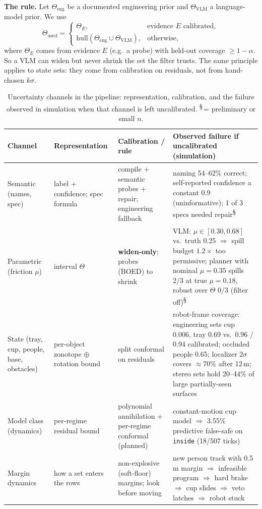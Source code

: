 \documentclass[10pt,twocolumn,letterpaper]{article}
\newcommand{\pre}{\textsuperscript{\S}}   %
\begin{document}
\textbf{The rule.} Let $\Theta_{\mathrm{eng}}$ be a documented engineering prior and $\Theta_{\mathrm{VLM}}$ a language-model prior. We use
\begin{equation}
\Theta_{\mathrm{used}}=\begin{cases}\Theta_E, & \text{evidence }E\text{ calibrated},\\
\mathrm{hull}(\Theta_{\mathrm{eng}}\cup\Theta_{\mathrm{VLM}}), & \text{otherwise,}\end{cases}
\end{equation}
where $\Theta_E$ comes from evidence $E$ (e.g.\ a probe) with held-out coverage $\ge1-\alpha$. So a VLM can widen but never shrink the set the filter trusts. The same principle applies to state sets: they come from calibration on
residuals, not from hand-chosen $k\sigma$.

\begin{table}[t]
\centering\small
\caption{Uncertainty channels in the pipeline: representation, calibration, and the failure observed in simulation when that channel
is left uncalibrated. \pre\,= preliminary or small $n$.}
\label{tab:uq}
\begin{tabular}{@{}p{2.6cm}p{2.9cm}p{3.3cm}p{7.3cm}@{}}
\toprule
Channel & Representation & Calibration / rule & Observed failure if uncalibrated (simulation)\\
\midrule
Semantic (names, spec) & label + confidence; spec formula & compile + semantic probes + repair; engineering fallback &
naming 54--62\% correct; self-reported confidence a constant 0.9 (uninformative); 1 of 3 specs needed repair\pre\\
Parametric (friction $\mu$) & interval $\Theta$ & \textbf{widen-only}; probes (BOED) to shrink &
VLM: $\mu\in[0.30,0.68]$ vs.\ truth 0.25 $\Rightarrow$ spill budget $1.2\times$ too permissive; planner with nominal $\mu{=}0.35$ spills 2/3 at true $\mu{=}0.18$, robust over $\Theta$ 0/3 (filter off)\pre\\
State (tray, cup, people, base, obstacles) & per-object zonotope $\oplus$ rotation bound & split conformal on residuals &
robot-frame coverage: engineering sets cup 0.006, tray 0.69 vs.\ 0.96 / 0.94 calibrated; occluded people 0.65; localizer $2\sigma$ covers $\approx$70\% after 12\,m; stereo sets hold 20--44\% of large partially-seen surfaces\\
Model class (dynamics) & per-regime residual bound & polynomial annihilation + per-regime conformal (planned) &
constant-motion cup model $\Rightarrow$ 3.55\% predictive false-safe on \texttt{inside} (18/507 ticks)\\
Margin dynamics & how a set enters the rows & non-explosive (soft-floor) margins; look before moving &
new person track with 0.5\,m margin $\Rightarrow$ infeasible program $\Rightarrow$ hard brake $\Rightarrow$ cup slides $\Rightarrow$ veto latches $\Rightarrow$ robot stuck\\
\bottomrule
\end{tabular}
\vspace{-2mm}
\end{table}
\end{document}
